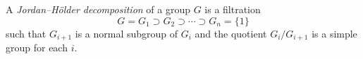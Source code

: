 \documentclass[12pt]{article}
\begin{document}
A {\em Jordan--H\"older decomposition} of a group $G$ is a filtration
$$
G = G_1 \supset G_2 \supset \cdots \supset G_n = \{1\}
$$
such that $G_{i+1}$ is a normal subgroup of $G_i$ and the quotient $G_i/G_{i+1}$ is a simple group for each $i$.
\end{document}
